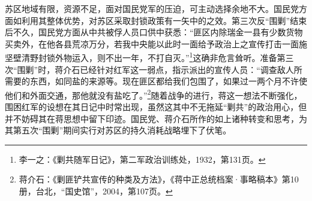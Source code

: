 苏区地域有限，资源不足，面对国民党军的压迫，可主动选择余地不大。国民党方面如利用其整体优势，对苏区采取封锁政策有一矢中的之效。第三次反“围剿”结束后不久，国民党方面从中共被俘人员口供中获悉：“匪区内除瑞金一县有少数货物买卖外，在他各县荒凉万分，若我中央能以此时一面给予政治上之宣传打击一面施坚壁清野封锁外物运入，则不出一年，不打自灭。”\footnote{李一之：《剿共随军日记》，第二军政治训练处，1932，第131页。}这确非危言耸听。准备第三次“围剿”时，蒋介石已经针对红军这一弱点，指示派出的宣传人员：“调查敌人所需要的东西，如同盐的来源等。现在匪区都给我们包围了，如果过一两个月不许使他们和外面交通，那他就没有盐吃了。”\footnote{蒋介石：《剿匪铲共宣传的种类及方法》，《蒋中正总统档案·事略稿本》第10册，台北，“国史馆”，2004，第107页。}随着战争的进行，蒋这一想法不断强化，围困红军的设想在其日记中时常出现，虽然这其中不无拖延“剿共”的政治用心，但并不妨碍其在蒋思想中留下印迹。国民党、蒋介石所作的如上诸种转变和思考，为其第五次“围剿”期间实行对苏区的持久消耗战略埋下了伏笔。

